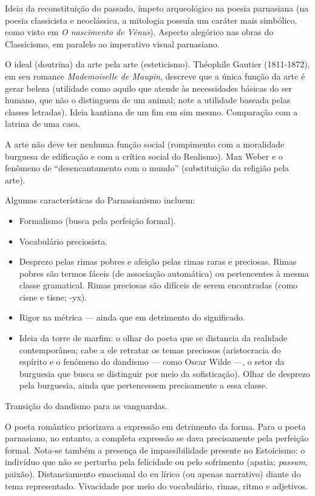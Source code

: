 Ideia da reconstituição do passado, ímpeto arqueológico na poesia parnasiana (na poesia classicista e neoclássica, a mitologia possuía um caráter mais simbólico, como visto em \textit{O nascimento de Vênus}). Aspecto alegórico nas obras do Classicismo, em paralelo ao imperativo visual parnasiano.

O ideal (doutrina) da arte pela arte (esteticismo). Théophile Gautier (1811-1872), em seu romance \textit{Mademoiselle de Maupin}, descreve que a única função da arte é gerar beleza (utilidade como aquilo que atende às necessidades básicas do ser humano, que não o distinguem de um animal; note a utilidade baseada pelas classes letradas). Ideia kantiana de um fim em sim mesmo. Comparação com a latrina de uma casa.

A arte não deve ter nenhuma função social (rompimento com a moralidade burguesa de edificação e com a crítica social do Realismo). Max Weber e o fenômeno de ``desencantamento com o mundo'' (substituição da religião pela arte).

Algumas características do Parnasianismo incluem:

\begin{itemize}
    \item Formalismo (busca pela perfeição formal).
    \item Vocabulário preciosista.
    \item Desprezo pelas rimas pobres e afeição pelas rimas raras e preciosas. Rimas pobres são termos fáceis (de associação automática) ou pertencentes à mesma classe gramatical. Rimas preciosas são difíceis de serem encontradas (como cisne e tisne; -yx).
    \item Rigor na métrica — ainda que em detrimento do significado.
    \item Ideia da torre de marfim: o olhar do poeta que se distancia da realidade contemporânea; cabe a ele retratar os temas preciosos (aristocracia do espírito e o fenômeno do dandismo — como Oscar Wilde —, o setor da burguesia que busca se distinguir por meio da sofisticação). Olhar de desprezo pela burguesia, ainda que pertencessem precisamente a essa classe.
\end{itemize}

Transição do dandismo para as vanguardas.

O poeta romântico priorizava a expressão em detrimento da forma. Para o poeta parnasiano, no entanto, a completa expressão se dava precisamente pela perfeição formal. Nota-se também a presença de impassibilidade presente no Estoicismo: o indivíduo que não se perturba pela felicidade ou pelo sofrimento (apatia; \textit{passum}, paixão). Distanciamento emocional do eu lírico (ou apenas narrativo) diante do tema representado. Vivacidade por meio do vocabulário, rimas, ritmo e adjetivos.